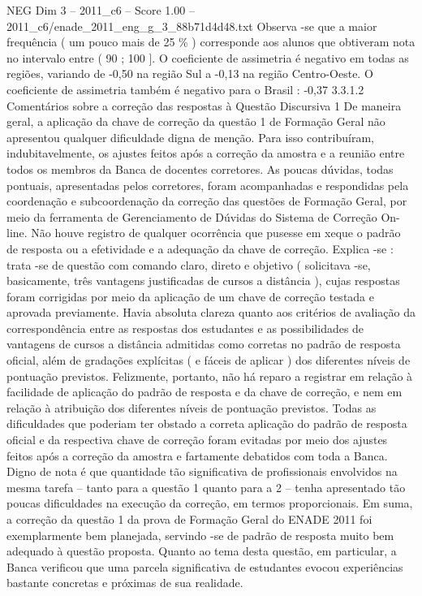\begin{textsample}{NEG Dim 3 – 2011\_c6 – Score 1.00 – 2011\_c6/enade\_2011\_eng\_g\_3\_88b71d4d48.txt}
Observa -se que a maior frequência ( um pouco mais de 25 \% ) corresponde aos alunos que obtiveram nota no intervalo entre ( 90 ; 100 ].
O coeficiente de assimetria é negativo em todas as regiões, variando de -0,50 na região Sul a -0,13 na região Centro-Oeste.
O coeficiente de assimetria também é negativo para o Brasil : -0,37 3.3.1.2 Comentários sobre a correção das respostas à Questão Discursiva 1 De maneira geral, a aplicação da chave de correção da questão 1 de Formação Geral não apresentou qualquer dificuldade digna de menção.
Para isso contribuíram, indubitavelmente, os ajustes feitos após a correção da amostra e a reunião entre todos os membros da Banca de docentes corretores.
As poucas dúvidas, todas pontuais, apresentadas pelos corretores, foram acompanhadas e respondidas pela coordenação e subcoordenação da correção das questões de Formação Geral, por meio da ferramenta de Gerenciamento de Dúvidas do Sistema de Correção On-line.
Não houve registro de qualquer ocorrência que pusesse em xeque o padrão de resposta ou a efetividade e a adequação da chave de correção.
Explica -se : trata -se de questão com comando claro, direto e objetivo ( solicitava -se, basicamente, três vantagens justificadas de cursos a distância ), cujas respostas foram corrigidas por meio da aplicação de um chave de correção testada e aprovada previamente.
Havia absoluta clareza quanto aos critérios de avaliação da correspondência entre as respostas dos estudantes e as possibilidades de vantagens de cursos a distância admitidas como corretas no padrão de resposta oficial, além de gradações explícitas ( e fáceis de aplicar ) dos diferentes níveis de pontuação previstos.
Felizmente, portanto, não há reparo a registrar em relação à facilidade de aplicação do padrão de resposta e da chave de correção, e nem em relação à atribuição dos diferentes níveis de pontuação previstos.
Todas as dificuldades que poderiam ter obstado a correta aplicação do padrão de resposta oficial e da respectiva chave de correção foram evitadas por meio dos ajustes feitos após a correção da amostra e fartamente debatidos com toda a Banca.
Digno de nota é que quantidade tão significativa de profissionais envolvidos na mesma tarefa – tanto para a questão 1 quanto para a 2 – tenha apresentado tão poucas dificuldades na execução da correção, em termos proporcionais.
Em suma, a correção da questão 1 da prova de Formação Geral do ENADE 2011 foi exemplarmente bem planejada, servindo -se de padrão de resposta muito bem adequado à questão proposta.
Quanto ao tema desta questão, em particular, a Banca verificou que uma parcela significativa de estudantes evocou experiências bastante concretas e próximas de sua realidade.

\end{textsample}
